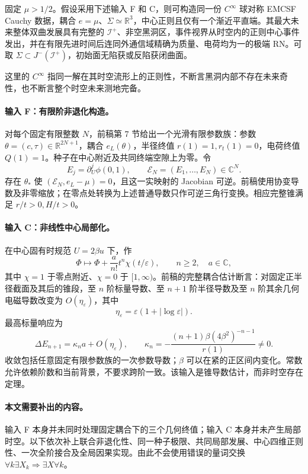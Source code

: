 \begin{theorem}[光滑实现与全局化]\label{thm:closure}
固定 $\mu>1/2$。假设采用下述输入 F 和 C，则可构造同一份 $C^\infty$ 球对称 EMCSF Cauchy 数据，耦合 $e=\mu$、$\Sigma\simeq\mathbb R^3$，中心正则且仅有一个渐近平直端。其最大未来整体双曲发展具有完整的 $\mathcal I^+$、非空黑洞区，事件视界从时空内的正则中心事件发出，并在有限先进时间后连同外通信域精确为质量、电荷均为一的极端 RN。可取 $\Sigma\subset J^-(\mathcal I^+)$，初始面无陷获或反陷获闭曲面。

这里的 $C^\infty$ 指同一解在其时空流形上的正则性，不断言黑洞内部不存在未来奇性，也不断言整个时空未来测地完备。
\end{theorem}

\paragraph{输入 F：有限阶非退化构造。}
对每个固定有限整数 $N$，前稿第 7 节给出一个光滑有限参数族：参数 $\theta=(c,\tau)\in\mathbb R^{2N+1}$，耦合 $e_L(\theta)$，半径终值 $r(1)=1,r_t(1)=0$，电荷终值 $Q(1)=1$。种子在中心附近及共同终端空隙上为零。令
\[
E_j=\partial_U^j\phi(0,1),\qquad
\mathcal E_N=(E_1,\ldots,E_N)\in\mathbb C^N.
\]
存在 $\theta_*$ 使 $(\mathcal E_N,e_L-\mu)=0$，且这一实映射的 Jacobian 可逆。前稿使用协变导数及非零缩放；在零点处转换为上述普通导数只作可逆三角行变换。相应完整锥满足 $r/t>0,H/t>0$。

\paragraph{输入 C：非线性中心局部化。}
在中心固有时规范 $U=2\beta u$ 下，作
\[
\Phi\longmapsto\Phi+\frac{a}{n!}t^n\chi(t/\varepsilon),
\qquad n\ge2,\quad a\in\mathbb C,
\]
其中 $\chi=1$ 于零点附近、$\chi=0$ 于 $[1,\infty)$。前稿的完整耦合估计断言：对固定正半径截面及其后的锥段，至 $n$ 阶标量导数、至 $n+1$ 阶半径导数及至 $n$ 阶其余几何电磁导数改变为 $O(\eta_\varepsilon)$，其中
\[
\eta_\varepsilon=\varepsilon(1+|\log\varepsilon|).
\]
最高标量响应为
\begin{equation}\label{eq:response}
\Delta E_{n+1}=\kappa_n a+O(\eta_\varepsilon),\qquad
\kappa_n=-\frac{(n+1)\beta(4\beta^2)^{-n-1}}{r(1)}\ne0.
\end{equation}
收敛包括任意固定有限参数族的一次参数导数；$\beta$ 可以在紧的正区间内变化。常数允许依赖阶数和当前背景，不要求跨阶一致。该输入是锥导数估计，而非时空存在定理。

\paragraph{本文需要补出的内容。}
输入 F 本身并未同时处理固定耦合下的三个几何终值；输入 C 本身并未产生局部时空。以下依次补上联合非退化性、同一种子极限、共同局部发展、中心四维正则性、一次全阶接合及全局因果实现。由此不会使用错误的量词交换 $\forall k\exists X_k\Rightarrow\exists X\forall k$。

